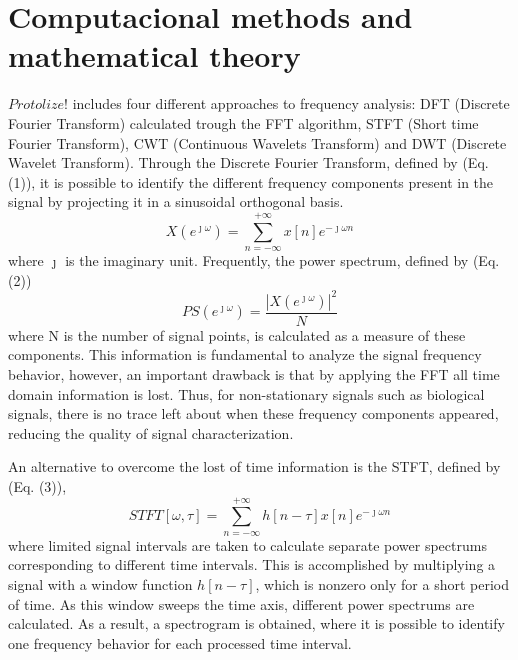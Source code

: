 \documentclass[12pt, a4paper]{article}
\begin{document}
\section{Computacional methods and mathematical theory}

$Protolize!$ includes four different approaches to frequency analysis: DFT (Discrete Fourier Transform) calculated trough the FFT algorithm, STFT (Short time Fourier Transform), CWT (Continuous Wavelets Transform) and DWT (Discrete Wavelet Transform).
Through the Discrete Fourier Transform, defined by (Eq. (1)), it is possible to identify the different frequency components present in the signal by projecting it in a sinusoidal orthogonal basis.
\begin{equation}
X(e^{\jmath \omega}) = \sum\limits_{n = -\infty}^{+\infty} x[n] e^{- \jmath \omega n}
\end{equation}
where $\jmath$ is the imaginary unit. Frequently, the power spectrum, defined by (Eq. (2))
\begin{equation}
PS(e^{\jmath \omega}) = \frac{|X(e^{\jmath \omega})|^2}{N}
\end{equation}
where N is the number of signal points, is calculated as a measure of these components. This information is fundamental to analyze the signal frequency behavior, however, an important drawback is that by applying the FFT all time domain information is lost. Thus, for non-stationary signals such as biological signals, there is no trace left about when these frequency components appeared, reducing the quality of signal characterization.

An alternative to overcome the lost of time information is the STFT, defined by (Eq. (3)),
\begin{equation}
STFT[\omega, \tau] = \sum\limits_{n = -\infty}^{+\infty} h[n - \tau] x[n] e^{- \jmath \omega n}
\end{equation}
where limited signal intervals are taken to calculate separate power spectrums corresponding to different time intervals. This is accomplished by multiplying a signal with a window function $h[n-\tau]$, which is nonzero only for a short period of time. As this window sweeps the time axis, different power spectrums are calculated. As a result, a spectrogram is obtained, where it is possible to identify one frequency behavior for each processed time interval.
\end{document}
